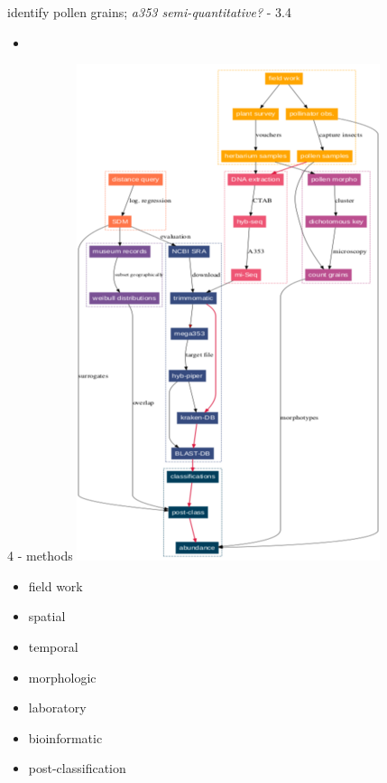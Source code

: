 \documentclass[
  ignorenonframetext,
]{beamer}
\providecommand{\tightlist}{%
  \setlength{\itemsep}{0pt}\setlength{\parskip}{0pt}}
\begin{document}
\begin{frame}{identify pollen grains; \emph{a353 semi-quantitative?} -
3.4}
\protect\hypertarget{identify-pollen-grains-a353-semi-quantitative---3.4}{}
\begin{itemize}
\tightlist
\item
\end{itemize}
\end{frame}

\begin{frame}{4 - methods}
\protect\hypertarget{methods}{}
\includegraphics{../graphics/plots/flowchart.resized.png}

\begin{itemize}
\tightlist
\item
  field work
\item
  spatial
\item
  temporal\\
\item
  morphologic\\
\item
  laboratory\\
\item
  bioinformatic\\
\item
  post-classification\\
\end{itemize}
\end{frame}
\end{document}
